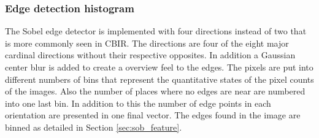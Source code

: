 \subsubsection{Edge detection histogram}
\label{sec:meth:featextr:edge}
The Sobel edge detector is implemented with four directions instead of two that is more commonly seen in CBIR. The directions are four of the eight major cardinal directions without their respective opposites. In addition a Gaussian center blur is added to create a overview feel to the edges. The pixels are put into different numbers of bins that represent the quantitative states of the pixel counts of the images. Also the number of places where no edges are near are numbered into one last bin. In addition to this the number of edge points in each orientation are presented in one final vector. The edges found in the image are binned as detailed in Section \ref{sec:sob_feature}.




